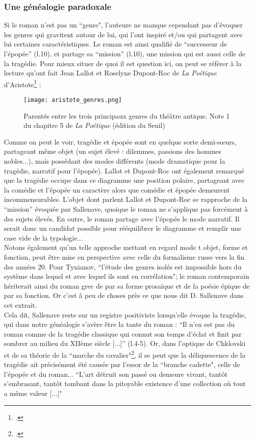 \documentclass[a4paper,10pt]{article}
\begin{document}
			\subsubsection{Une généalogie paradoxale}\label{genealogie}
				Si le roman n'est pas un ``genre", l'auteure ne manque cependant pas d'évoquer les genres qui gravitent autour de lui, qui l'ont inspiré et/ou qui partagent avec lui certaines caractéristiques. Le roman est ainsi qualifié de ``successeur de l'épopée'' (l.10), et partage sa ``mission'' (l.10), une mission qui est aussi celle de la tragédie. Pour mieux situer de quoi il est question ici, on peut se référer à la lecture qu'ont fait Jean Lallot et Roselyne Dupont-Roc de \textit{La Poétique} d'Aristote\footcite{Lallot1980} :
				\begin{figure}[h]
					\begin{center}
						\texttt{[image: aristote\_genres.png]}
						\caption{Parentés entre les trois principaux genres du théâtre antique. Note 1 du chapitre 5 de \textit{La Poétique} (édition du Seuil)}
					\end{center}
				\end{figure}
				
				Comme on peut le voir, tragédie et épopée sont en quelque sorte demi-sœurs, partageant même objet (un sujet élevé : dilemmes, passions des hommes nobles...), mais possédant des modes différents (mode dramatique pour la tragédie, narratif pour l'épopée). Lallot et Dupont-Roc ont également remarqué que la tragédie occupe dans ce diagramme une position polaire, partageant avec la comédie et l'épopée un caractère alors que comédie et épopée demeurent incommensurables. L'objet dont parlent Lallot et Dupont-Roc se rapproche de la ``mission'' évoquée par Sallenave, quoique le roman ne s'applique pas forcément à des sujets élevés. En outre, le roman partage avec l'épopée le mode narratif. Il serait donc un candidat possible pour rééquilibrer le diagramme et remplir une case vide de la typologie...\\
				Notons également qu'un telle approche mettant en regard mode t objet, forme et fonction, peut être mise en perspective avec celle du formalisme russe vers la fin des années 20. Pour Tynianov, ``l'étude des genres isolés est impossible hors du système dans lequel et avec lequel ils sont en corrélation"; le roman contemporain hériterait ainsi du roman grec de par sa forme prosaïque et de la poésie épique de par sa fonction. Or c'est à peu de choses près ce que nous dit D. Sallenave dans cet extrait.\\
				Cela dit, Sallenave reste sur un registre positiviste lorsqu'elle évoque la tragédie, qui dans notre généalogie s'avère être la tante du roman : ``Il n'en est pas du roman comme de la tragédie classique qui connut son temps d'éclat et finit par sombrer au milieu du XIIème siècle [...]'' (l.4-5). Or, dans l'optique de Chklovski et de sa théorie de la ``marche du cavalier"\footcite{Chklovski1973}, il se peut que la déliquescence de la tragédie ait précisément été causée par l'essor de la ``branche cadette", celle de l'épopée et du roman... ``L'art détruit son passé ou demeure vivant, tantôt s'embrasant, tantôt tombant dans la pitoyable existence d'une collection où tout a même valeur [...]"
		
\end{document}
